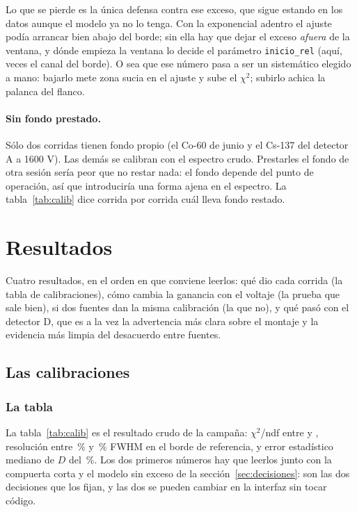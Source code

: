 \documentclass[11pt,a4paper]{article}
\begin{document}
Lo que se pierde es la única defensa contra ese exceso, que sigue estando en
los datos aunque el modelo ya no lo tenga. Con la exponencial adentro el ajuste
podía arrancar bien abajo del borde; sin ella hay que dejar el exceso
\emph{afuera} de la ventana, y dónde empieza la ventana lo decide el parámetro
\texttt{inicio\_rel} (aquí, \InicioRel{} veces el canal del borde). O sea que
ese número pasa a ser un sistemático elegido a mano: bajarlo mete zona sucia en
el ajuste y sube el $\chi^2$; subirlo achica la palanca del flanco.

\paragraph{Sin fondo prestado.} Sólo dos corridas tienen fondo propio (el
Co-60 de junio y el Cs-137 del detector A a 1600 V). Las demás se calibran con
el espectro crudo. Prestarles el fondo de otra sesión sería peor que no restar
nada: el fondo depende del punto de operación, así que introduciría una forma
ajena en el espectro. La tabla~\ref{tab:calib} dice corrida por corrida cuál
lleva fondo restado.

\section{Resultados}
\label{sec:resultados}

Cuatro resultados, en el orden en que conviene leerlos: qué dio cada corrida
(la tabla de calibraciones), cómo cambia la ganancia con el voltaje (la
prueba que sale bien), si dos fuentes dan la misma calibración (la que no), y
qué pasó con el detector D, que es a la vez la advertencia más clara sobre el
montaje y la evidencia más limpia del desacuerdo entre fuentes.

\subsection{Las \NCorridas{} calibraciones}
\label{sec:calibraciones}

\subsubsection{La tabla}

La tabla~\ref{tab:calib} es el resultado crudo de la campaña: $\chi^2$/ndf
entre \ChiMin{} y \ChiMax{}, resolución entre \FwhmMin\,\% y \FwhmMax\,\% FWHM
en el borde de referencia, y error estadístico mediano de $D$ del
\ErrRelMediano\,\%. Los dos primeros números hay que leerlos junto con la
compuerta corta y el modelo sin exceso de la sección~\ref{sec:decisiones}: son
las dos decisiones que los fijan, y las dos se pueden cambiar en la interfaz
sin tocar código.
\end{document}
